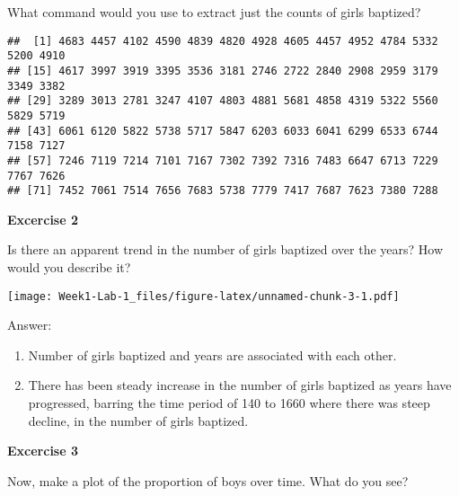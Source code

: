 \documentclass[]{article}
\newenvironment{Shaded}{\begin{snugshade}}{\end{snugshade}}
\newcommand{\DataTypeTok}[1]{\textcolor[rgb]{0.13,0.29,0.53}{#1}}
\newcommand{\KeywordTok}[1]{\textcolor[rgb]{0.13,0.29,0.53}{\textbf{#1}}}
\newcommand{\NormalTok}[1]{#1}
\newcommand{\OperatorTok}[1]{\textcolor[rgb]{0.81,0.36,0.00}{\textbf{#1}}}
\newcommand{\StringTok}[1]{\textcolor[rgb]{0.31,0.60,0.02}{#1}}
\begin{document}
What command would you use to extract just the counts of girls baptized?

\begin{Shaded}
\end{Shaded}

\begin{verbatim}
##  [1] 4683 4457 4102 4590 4839 4820 4928 4605 4457 4952 4784 5332 5200 4910
## [15] 4617 3997 3919 3395 3536 3181 2746 2722 2840 2908 2959 3179 3349 3382
## [29] 3289 3013 2781 3247 4107 4803 4881 5681 4858 4319 5322 5560 5829 5719
## [43] 6061 6120 5822 5738 5717 5847 6203 6033 6041 6299 6533 6744 7158 7127
## [57] 7246 7119 7214 7101 7167 7302 7392 7316 7483 6647 6713 7229 7767 7626
## [71] 7452 7061 7514 7656 7683 5738 7779 7417 7687 7623 7380 7288
\end{verbatim}

\textbf{Excercise 2}

Is there an apparent trend in the number of girls baptized over the
years? How would you describe it?

\begin{Shaded}
\end{Shaded}

\texttt{[image: Week1-Lab-1\_files/figure-latex/unnamed-chunk-3-1.pdf]}

Answer:

\begin{enumerate}
\def\labelenumi{\arabic{enumi}.}
\item
  Number of girls baptized and years are associated with each other.
\item
  There has been steady increase in the number of girls baptized as
  years have progressed, barring the time period of 140 to 1660 where
  there was steep decline, in the number of girls baptized.
\end{enumerate}

\textbf{Excercise 3}

Now, make a plot of the proportion of boys over time. What do you see?
\end{document}
